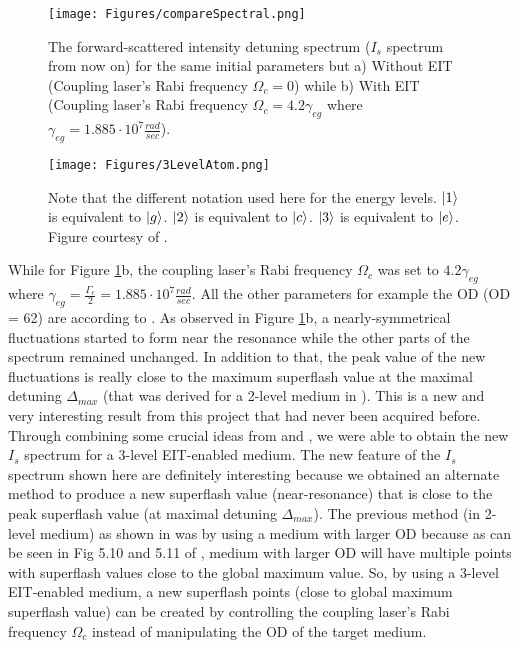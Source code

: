 \begin{figure}[h!]
    \centering
    \texttt{[image: Figures/compareSpectral.png]}
    \caption{The forward-scattered intensity detuning spectrum ($I_{s}$ spectrum from now on) for the same initial parameters but a) Without EIT (Coupling laser's Rabi frequency $\Omega_{c} = 0$) while b) With EIT (Coupling laser's Rabi frequency $\Omega_{c} = 4.2\gamma_{eg}$ where $\gamma_{eg} = 1.885 \cdot 10^{7} \frac{rad}{sec}$).}
    \label{fig: comparing Is spectrum}
\end{figure}

\begin{figure}[h!]
    \centering
    \texttt{[image: Figures/3LevelAtom.png]}
    \caption{Note that the different notation used here for the energy levels. $\ket{1}$ is equivalent to $\ket{g}$. $\ket{2}$ is equivalent to $\ket{c}$. $\ket{3}$ is equivalent to $\ket{e}$. Figure courtesy of \cite{Jeong2009}.}
    \label{fig: 3LevelAtom}
\end{figure}

While for Figure \ref{fig: comparing Is spectrum}b, the coupling laser's Rabi frequency $\Omega_{c}$ was set to $4.2\gamma_{eg}$ where $\gamma_{eg} = \frac{\Gamma_{e}}{2} = 1.885 \cdot 10^{7} \frac{rad}{sec}$. All the other parameters for example the OD (OD = 62) are according to \cite{jeong2010slow}. As observed in Figure \ref{fig: comparing Is spectrum}b, a nearly-symmetrical fluctuations started to form near the resonance while the other parts of the spectrum remained unchanged. In addition to that, the peak value of the new fluctuations is really close to the maximum superflash value at the maximal detuning $\Delta_{max}$ (that was derived for a 2-level medium in \cite{Kwong2017}). This is a new and very interesting result from this project that had never been acquired before.\\

Through combining some crucial ideas from \cite{Kwong2014} and \cite{jeong2010slow}, we were able to obtain the new $I_{s}$ spectrum for a 3-level EIT-enabled medium. The new feature of the $I_{s}$ spectrum shown here are definitely interesting because we obtained an alternate method to produce a new superflash value (near-resonance) that is close to the peak superflash value (at maximal detuning $\Delta_{max}$). The previous method (in 2-level medium) as shown in \cite{Kwong2017} was by using a medium with larger OD because as can be seen in Fig 5.10 and 5.11 of \cite{Kwong2017}, medium with larger OD will have multiple points with superflash values close to the global maximum value. So, by using a 3-level EIT-enabled medium, a new superflash points (close to global maximum superflash value) can be created by controlling the coupling laser's Rabi frequency $\Omega_{c}$ instead of manipulating the OD of the target medium.


